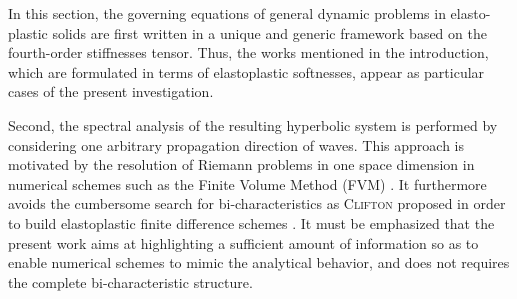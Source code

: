 In this section, the governing equations of general dynamic problems in elasto-plastic solids are first written in a unique and generic framework based on the fourth-order stiffnesses tensor.
Thus, the works mentioned in the introduction, which are formulated in terms of elastoplastic softnesses, appear as particular cases of the present investigation.

Second, the spectral analysis of the resulting hyperbolic system is performed by considering one arbitrary propagation direction of waves.
This approach is motivated by the resolution of Riemann problems in one space dimension in numerical schemes such as the Finite Volume Method (FVM) \cite{Leveque,Toro}.
It furthermore avoids the cumbersome search for bi-characteristics as \textsc{Clifton} proposed in order to build elastoplastic finite difference schemes \cite{Clifton_thesis}.
It must be emphasized that the present work aims at highlighting a sufficient amount of information so as to enable numerical schemes to mimic the analytical behavior, and does not requires the complete bi-characteristic structure.

